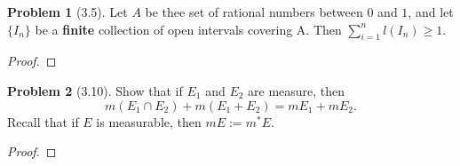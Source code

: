 \documentclass[12pt]{article}
\theoremstyle{definition}
\newtheorem{problem}{Problem}
\begin{document}
\begin{problem}[3.5]

    Let \( A \) be thee set of rational numbers between \( 0 \) and \( 1 \), and let \( \{ I_n \} \) be a \textbf{finite} collection of open intervals covering A. Then \( \displaystyle \sum_{i=1}^{n} l(I_n) \geq 1 \).

        \begin{proof}
            
        \end{proof}
     
\end{problem}

\begin{problem}[3.10]

    Show that if \( E_1 \) and \( E_2 \) are measure, then 
        \[
            m(E_1 \cap  E_2) + m(E_1 + E_2) = mE_1 + mE_2.
        \]
    Recall that if \( E \) is measurable, then \( mE := m^{*} E \).

        \begin{proof}
            
        \end{proof}
    
\end{problem}
\end{document}
